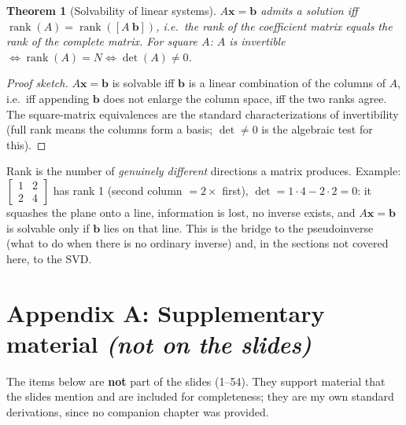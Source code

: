 \documentclass[11pt,a4paper]{article}
\newcommand{\rank}{\operatorname{rank}}
\theoremstyle{definition}
\theoremstyle{plain}
\newtheorem{theorem}[definition]{Theorem}
\begin{document}
\begin{theorem}[Solvability of linear systems]\label{thm:rc}
$A\mathbf x=\mathbf b$ admits a solution iff $\rank(A)=\rank([A\ \mathbf b])$, i.e.\ the rank of the coefficient matrix equals the rank of the complete matrix. For square $A$: $A$ is invertible $\iff\rank(A)=N\iff\det(A)\ne0$.
\end{theorem}
\begin{proof}[Proof sketch]
$A\mathbf x=\mathbf b$ is solvable iff $\mathbf b$ is a linear combination of the columns of $A$, i.e.\ iff appending $\mathbf b$ does not enlarge the column space, iff the two ranks agree. The square-matrix equivalences are the standard characterizations of invertibility (full rank means the columns form a basis; $\det\neq0$ is the algebraic test for this).
\end{proof}

\begin{intuition}
Rank is the number of \emph{genuinely different} directions a matrix produces. Example: $\begin{bmatrix}1&2\\2&4\end{bmatrix}$ has rank 1 (second column $=2\times$ first), $\det=1\cdot4-2\cdot2=0$: it squashes the plane onto a line, information is lost, no inverse exists, and $A\mathbf x=\mathbf b$ is solvable only if $\mathbf b$ lies on that line. This is the bridge to the pseudoinverse (what to do when there is no ordinary inverse) and, in the sections not covered here, to the SVD.
\end{intuition}

\section*{Appendix A: Supplementary material \emph{(not on the slides)}}\label{app:supp}

\begin{tcolorbox}[colback=yellow!8,colframe=yellow!50!black,boxrule=0.5pt,arc=2pt]
\small The items below are \textbf{not} part of the slides (1--54). They support material that the slides mention and are included for completeness; they are my own standard derivations, since no companion chapter was provided.
\end{tcolorbox}
\end{document}
